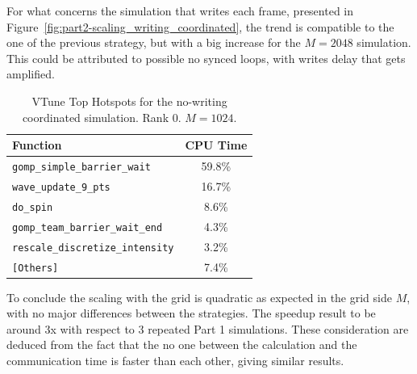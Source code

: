 For what concerns the simulation that writes each frame, presented in
Figure~\ref{fig:part2-scaling_writing_coordinated}, the trend is
compatible to the one of the previous strategy, but with a big increase for the
$M= 2048$ simulation. This could be attributed to possible no synced
loops, with writes
delay that gets amplified.
\begin{table}[h]
  \centering
  \small
  \begin{tabular}{lc}
    \toprule
    Function & CPU Time \\
    \midrule
    \texttt{gomp\_simple\_barrier\_wait} & 59.8\% \\
    \texttt{wave\_update\_9\_pts} & 16.7\% \\
    \texttt{do\_spin} & 8.6\% \\
    \texttt{gomp\_team\_barrier\_wait\_end} & 4.3\% \\
    \texttt{rescale\_discretize\_intensity} & 3.2\% \\
    \texttt{[Others]} & 7.4\% \\
    \bottomrule
  \end{tabular}
  \caption{VTune Top Hotspots for the
  no-writing coordinated simulation. Rank 0. $M = 1024$.}
  \label{tab:vtune_hotspots_coordinated}
\end{table}

%
%
%
%

To conclude the scaling with the grid is quadratic as expected in the grid side
$M$, with no major differences between the strategies. The speedup result to be
around 3x with respect to 3 repeated Part 1 simulations.
These consideration are deduced from the fact that the no one between
the calculation and
the communication time is faster than each other, giving similar results.